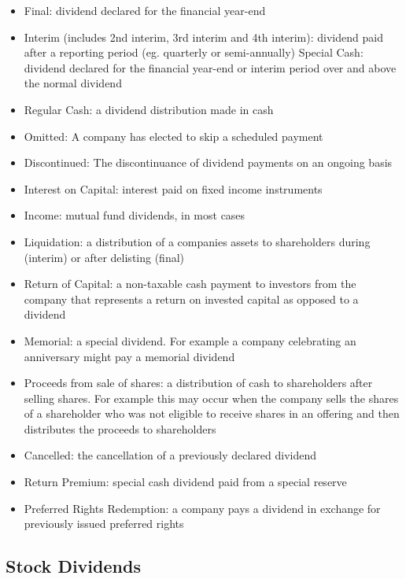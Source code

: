 \documentclass[12pt,preprint, authoryear]{elsarticle}
\numberwithin{equation}{section}
\numberwithin{figure}{section}
\numberwithin{table}{section}
\def\tightlist{} %
\begin{document}
\begin{itemize}
\tightlist
\item
  Final: dividend declared for the financial year-end
\item
  Interim (includes 2nd interim, 3rd interim and 4th interim): dividend
  paid after a reporting period (eg. quarterly or semi-annually) Special
  Cash: dividend declared for the financial year-end or interim period
  over and above the normal dividend
\item
  Regular Cash: a dividend distribution made in cash
\item
  Omitted: A company has elected to skip a scheduled payment
\item
  Discontinued: The discontinuance of dividend payments on an ongoing
  basis
\item
  Interest on Capital: interest paid on fixed income instruments
\item
  Income: mutual fund dividends, in most cases
\item
  Liquidation: a distribution of a companies assets to shareholders
  during (interim) or after delisting (final)
\item
  Return of Capital: a non-taxable cash payment to investors from the
  company that represents a return on invested capital as opposed to a
  dividend
\item
  Memorial: a special dividend. For example a company celebrating an
  anniversary might pay a memorial dividend
\item
  Proceeds from sale of shares: a distribution of cash to shareholders
  after selling shares. For example this may occur when the company
  sells the shares of a shareholder who was not eligible to receive
  shares in an offering and then distributes the proceeds to
  shareholders
\item
  Cancelled: the cancellation of a previously declared dividend
\item
  Return Premium: special cash dividend paid from a special reserve
\item
  Preferred Rights Redemption: a company pays a dividend in exchange for
  previously issued preferred rights
\end{itemize}

\hypertarget{stock-dividends}{%
\subsection{Stock Dividends}\label{stock-dividends}}
\end{document}

